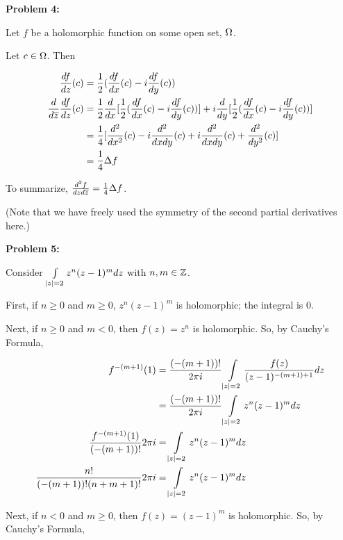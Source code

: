 \documentclass[a4paper,12pt]{article}
\begin{document}
\shunt

{\bf Problem 4:}

Let $f$ be a holomorphic function on some open set, $\Omega$.

Let $c \in \Omega$. Then 

\begin{align*}
\frac{df}{dz}(c) &= \frac{1}{2}(\frac{df}{dx}(c)-i\frac{df}{dy}(c))\\
\frac{d}{d\overline{z}}\frac{df}{dz}(c) &= \frac{1}{2} \frac{d}{dx}[\frac{1}{2}(\frac{df}{dx}(c)-i\frac{df}{dy}(c))] +i\frac{d}{dy}[\frac{1}{2}(\frac{df}{dx}(c)-i\frac{df}{dy}(c))]\\
&=\frac{1}{4}[\frac{d^2}{dx^2}(c) -i\frac{d^2}{dxdy}(c) +i\frac{d^2}{dxdy}(c) + \frac{d^2}{dy^2}(c)]\\
&=\frac{1}{4}\Delta f
\end{align*}

To summarize, $\frac{d^2f}{dzd\overline{z}} = \frac{1}{4} \Delta f$.

(Note that we have freely used the symmetry of the second partial derivatives here.)

\shunt

{\bf Problem 5:} %

Consider $\int\limits_{\left\lvert z \right\rvert = 2} z^n(z-1)^m dz$ with $n, m \in \mathbb{Z}$.

First, if $n \geq 0$ and $m \geq 0$, $z^n(z-1)^m$ is holomorphic; the integral is $0$.

\vspace{5mm}

Next, if $n \geq 0$ and $m < 0$, then $f(z)=z^n$ is holomorphic. So, by Cauchy's Formula, 

\begin{align*}
f^{-(m+1)}(1) &= \frac{(-(m+1))!}{2\pi i} \int\limits_{\left\lvert z \right\rvert=2} \frac{f(z)}{(z-1)^{-(m+1)+1}} dz\\
&= \frac{(-(m+1))!}{2\pi i} \int\limits_{\left\lvert z \right\rvert=2} z^n(z-1)^m dz\\
\frac{f^{-(m+1)}(1)}{(-(m+1))!} 2\pi i &= \int\limits_{\left\lvert z \right\rvert=2} z^n(z-1)^m dz\\
\frac{n!}{(-(m+1))!(n+m+1)!} 2\pi i &= \int\limits_{\left\lvert z \right\rvert=2} z^n(z-1)^m dz\\
\end{align*}

\vspace{5mm}

Next, if $n < 0$ and $m \geq 0$, then $f(z)=(z-1)^m$ is holomorphic. So, by Cauchy's Formula, 
\end{document}
